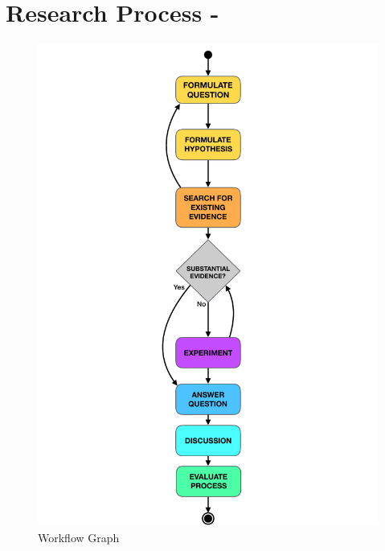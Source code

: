 
\section{Research Process - \checklist}
\label{sec:research process}

\begin{figure}
	\centering
	\includegraphics[width=13cm]{figures/workflow_graph.pdf}
	\caption{Workflow Graph}
	\label{fig:workflow_graph}
\end{figure}
